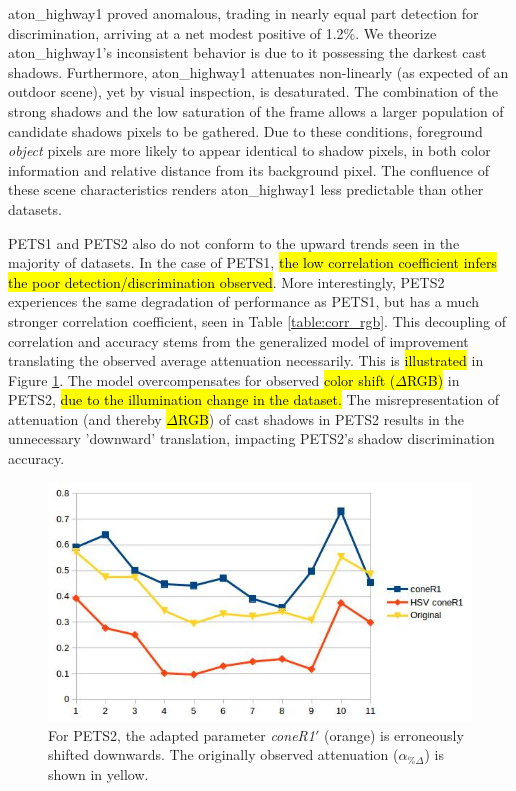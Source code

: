 \documentclass[12pt]{report}
\begin{document}
aton\_highway1 proved anomalous, trading in nearly equal part detection for discrimination, arriving at a net modest positive of 1.2\%. We theorize aton\_highway1's inconsistent behavior is due to it possessing the darkest cast shadows. Furthermore, aton\_highway1 attenuates non-linearly (as expected of an outdoor scene), yet by visual inspection, is desaturated. The combination of the strong shadows and the low saturation of the frame allows a larger population of candidate shadows pixels to be gathered. Due to these conditions, foreground \textit{object} pixels are more likely to appear identical to shadow pixels, in both color information and relative distance from its background pixel. The confluence of these scene characteristics renders aton\_highway1 less predictable than other datasets.

PETS1 and PETS2 also do not conform to the upward trends seen in the majority of datasets. In the case of PETS1, \hl{the low correlation coefficient infers the poor detection/discrimination observed}. More interestingly, PETS2 experiences the same degradation of performance as PETS1, but has a much stronger correlation coefficient, seen in Table \ref{table:corr_rgb}. This decoupling of correlation and accuracy stems from the generalized model of improvement translating the observed average attenuation necessarily. This is \hl{illustrated} in Figure \ref{fig:pets2_translate}. The model overcompensates for observed \hl{color shift ($\Delta$RGB)} in PETS2, \hl{due to the illumination change in the dataset.} The misrepresentation of attenuation (and thereby \hl{$\Delta$RGB}) of cast shadows in PETS2 results in the unnecessary 'downward' translation, impacting PETS2's shadow discrimination accuracy.

\begin{figure}
  \centering
  \includegraphics[width=1\linewidth]{figures/model/pets2_translate.jpg}
\caption{For PETS2, the adapted parameter \textit{coneR1}$'$ (orange) is erroneously shifted downwards. The originally observed attenuation ($\alpha_{\%\Delta}$) is shown in yellow.}
\label{fig:pets2_translate}
\end{figure} 
\end{document}
